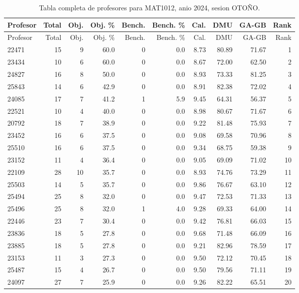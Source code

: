 \begingroup
\scriptsize
\setlength{\tabcolsep}{3pt}
\begin{longtable}{lrrrrrrrrr}
\caption{Tabla completa de profesores para MAT1012, anio 2024, sesion OTOÑO.}\label{tab:prof-period-mat1012-2024-oto-o}\\
\toprule
Profesor & Total & Obj. & Obj. \% & Bench. & Bench. \% & Cal. & DMU & GA-GB & Rank \\
\midrule
\endfirsthead
\toprule
Profesor & Total & Obj. & Obj. \% & Bench. & Bench. \% & Cal. & DMU & GA-GB & Rank \\
\midrule
\endhead
22471 & 15 & 9 & 60.0 & 0 & 0.0 & 8.73 & 80.89 & 71.67 & 1 \\
23434 & 10 & 6 & 60.0 & 0 & 0.0 & 8.67 & 72.00 & 62.50 & 2 \\
24827 & 16 & 8 & 50.0 & 0 & 0.0 & 8.93 & 73.33 & 81.25 & 3 \\
25843 & 14 & 6 & 42.9 & 0 & 0.0 & 8.91 & 82.38 & 72.02 & 4 \\
24085 & 17 & 7 & 41.2 & 1 & 5.9 & 9.45 & 64.31 & 56.37 & 5 \\
22521 & 10 & 4 & 40.0 & 0 & 0.0 & 8.98 & 80.67 & 71.67 & 6 \\
20792 & 18 & 7 & 38.9 & 0 & 0.0 & 9.22 & 81.48 & 75.93 & 7 \\
23452 & 16 & 6 & 37.5 & 0 & 0.0 & 9.08 & 69.58 & 70.96 & 8 \\
25510 & 16 & 6 & 37.5 & 0 & 0.0 & 9.34 & 68.75 & 59.38 & 9 \\
23152 & 11 & 4 & 36.4 & 0 & 0.0 & 9.05 & 69.09 & 71.02 & 10 \\
22109 & 28 & 10 & 35.7 & 0 & 0.0 & 8.93 & 74.76 & 73.29 & 11 \\
25503 & 14 & 5 & 35.7 & 0 & 0.0 & 9.86 & 76.67 & 63.10 & 12 \\
25494 & 25 & 8 & 32.0 & 0 & 0.0 & 9.47 & 72.53 & 71.33 & 13 \\
25496 & 25 & 8 & 32.0 & 1 & 4.0 & 9.28 & 69.33 & 64.00 & 14 \\
22446 & 23 & 7 & 30.4 & 0 & 0.0 & 9.42 & 76.81 & 66.03 & 15 \\
23836 & 18 & 5 & 27.8 & 0 & 0.0 & 9.68 & 71.48 & 66.09 & 16 \\
23885 & 18 & 5 & 27.8 & 0 & 0.0 & 9.21 & 82.96 & 78.59 & 17 \\
23153 & 11 & 3 & 27.3 & 0 & 0.0 & 9.50 & 72.12 & 70.45 & 18 \\
25487 & 15 & 4 & 26.7 & 0 & 0.0 & 9.50 & 79.56 & 71.11 & 19 \\
24097 & 27 & 7 & 25.9 & 0 & 0.0 & 9.26 & 82.22 & 65.51 & 20 \\

\end{longtable}
